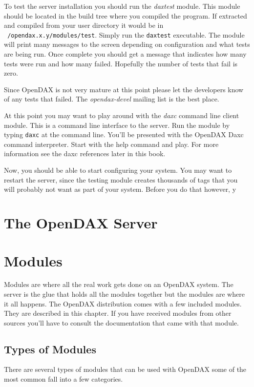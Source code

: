 \documentclass[10pt,letterpaper]{report}
\begin{document}
To test the server installation you should run the \textit{daxtest} module.  This module should be located in the build tree where you compiled the program.  If extracted and compiled from your user directory it would be in \texttt{~/opendax.x.y/modules/test}.  Simply run the \texttt{daxtest} executable.  The module will print many messages to the screen depending on configuration and what tests are being run.  Once complete you should get a message that indicates how many tests were run and how many failed.  Hopefully the number of tests that fail is zero.

Since OpenDAX is not very mature at this point please let the developers know of any tests that failed.  The \textit{opendax-devel} mailing list is the best place.

At this point you may want to play around with the \textit{daxc} command line client module.  This is a command line interface to the server.  Run the module by typing \texttt{daxc} at the command line.  You'll be presented with the OpenDAX Daxc command interpreter.  Start with the help command and play.  For more information see the daxc references later in this book.

Now, you should be able to start configuring your system.  You may want to restart the server, since the testing module creates thousands of tags that you will probably not want as part of your system.  Before you do that however, y

\chapter{The OpenDAX Server}


\chapter{Modules}
Modules are where all the real work gets done on an OpenDAX system.  The server is the glue that holds all the modules together but the modules are where it all happens.  The OpenDAX distribution comes with a few included modules.  They are described in this chapter.  If you have received modules from other sources you'll have to consult the documentation that came with that module.

\section{Types of Modules}
There are several types of modules that can be used with OpenDAX some of the most common fall into a few categories.
\end{document}
